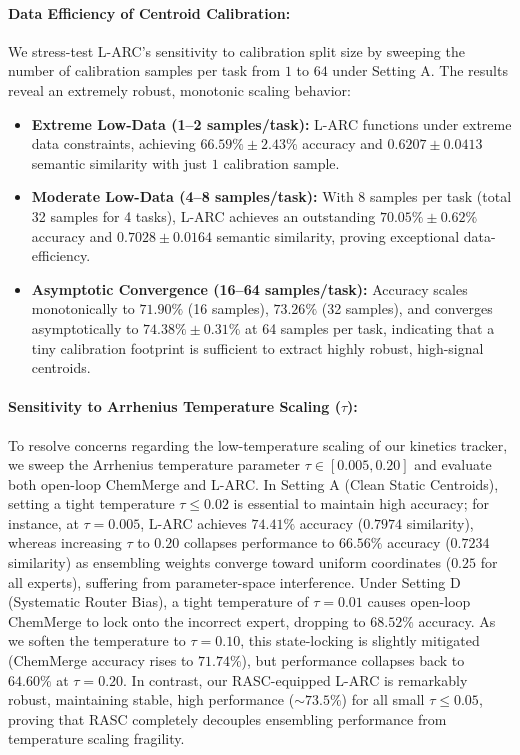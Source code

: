 \paragraph{Data Efficiency of Centroid Calibration:}
We stress-test L-ARC's sensitivity to calibration split size by sweeping the number of calibration samples per task from $1$ to $64$ under Setting A. The results reveal an extremely robust, monotonic scaling behavior:
\begin{itemize}
    \item \textbf{Extreme Low-Data (1--2 samples/task):} L-ARC functions under extreme data constraints, achieving $66.59\% \pm 2.43\%$ accuracy and $0.6207 \pm 0.0413$ semantic similarity with just $1$ calibration sample.
    \item \textbf{Moderate Low-Data (4--8 samples/task):} With $8$ samples per task (total 32 samples for 4 tasks), L-ARC achieves an outstanding $70.05\% \pm 0.62\%$ accuracy and $0.7028 \pm 0.0164$ semantic similarity, proving exceptional data-efficiency.
    \item \textbf{Asymptotic Convergence (16--64 samples/task):} Accuracy scales monotonically to $71.90\%$ (16 samples), $73.26\%$ (32 samples), and converges asymptotically to $74.38\% \pm 0.31\%$ at 64 samples per task, indicating that a tiny calibration footprint is sufficient to extract highly robust, high-signal centroids.
\end{itemize}

\paragraph{Sensitivity to Arrhenius Temperature Scaling ($\tau$):}
To resolve concerns regarding the low-temperature scaling of our kinetics tracker, we sweep the Arrhenius temperature parameter $\tau \in [0.005, 0.20]$ and evaluate both open-loop ChemMerge and L-ARC. In Setting A (Clean Static Centroids), setting a tight temperature $\tau \le 0.02$ is essential to maintain high accuracy; for instance, at $\tau = 0.005$, L-ARC achieves $74.41\%$ accuracy ($0.7974$ similarity), whereas increasing $\tau$ to $0.20$ collapses performance to $66.56\%$ accuracy ($0.7234$ similarity) as ensembling weights converge toward uniform coordinates ($0.25$ for all experts), suffering from parameter-space interference. Under Setting D (Systematic Router Bias), a tight temperature of $\tau = 0.01$ causes open-loop ChemMerge to lock onto the incorrect expert, dropping to $68.52\%$ accuracy. As we soften the temperature to $\tau = 0.10$, this state-locking is slightly mitigated (ChemMerge accuracy rises to $71.74\%$), but performance collapses back to $64.60\%$ at $\tau = 0.20$. In contrast, our RASC-equipped L-ARC is remarkably robust, maintaining stable, high performance ($\sim 73.5\%$) for all small $\tau \le 0.05$, proving that RASC completely decouples ensembling performance from temperature scaling fragility.

